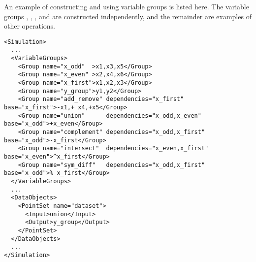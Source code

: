 An example of constructing and using variable groups is listed here.  The variable groups , 
, ,  and   are constructed independently, and the 
remainder are examples of other operations. 
\begin{lstlisting}[style=XML,morekeywords={name,file}] %moreemph={name,file}]
<Simulation>
  ...
  <VariableGroups>
    <Group name="x_odd"  >x1,x3,x5</Group>
    <Group name="x_even" >x2,x4,x6</Group>
    <Group name="x_first">x1,x2,x3</Group>
    <Group name="y_group">y1,y2</Group>
    <Group name="add_remove" dependencies="x_first"         base="x_first">-x1,+ x4,+x5</Group>
    <Group name="union"      dependencies="x_odd,x_even"    base="x_odd">+x_even</Group>
    <Group name="complement" dependencies="x_odd,x_first"   base="x_odd">-x_first</Group>
    <Group name="intersect"  dependencies="x_even,x_first"  base="x_even">^x_first</Group>
    <Group name="sym_diff"   dependencies="x_odd,x_first"   base="x_odd">% x_first</Group>
  </VariableGroups>
  ...
  <DataObjects>
    <PointSet name="dataset">
      <Input>union</Input>
      <Output>y_group</Output>
    </PointSet>
  </DataObjects>
  ...
</Simulation>
\end{lstlisting}
